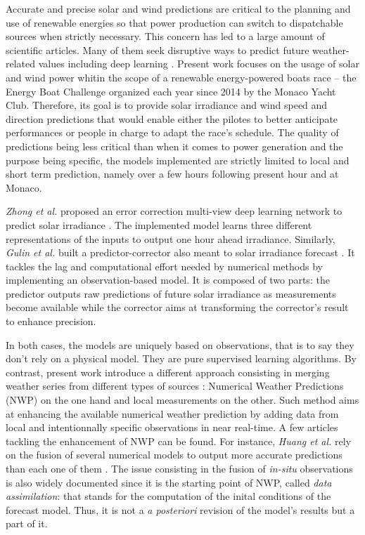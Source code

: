 \documentclass{article}
\newcommand{\saut}{\vspace{10px}}
\begin{document}
Accurate and precise solar and wind predictions are critical to the planning and use of renewable energies so that
power production can switch to dispatchable sources when strictly necessary. This concern has led to a large amount of
scientific articles. Many of them seek disruptive ways to predict future weather-related values including deep learning
\cite{zhong_multi-view_2021}.
Present work focuses on the usage of solar and wind power whitin the scope of a renewable energy-powered boats race
-- the Energy Boat Challenge organized each year since 2014 by the Monaco Yacht Club. Therefore, its goal is to provide
solar irradiance and wind speed and direction predictions that would enable either the pilotes to better anticipate
performances or people in charge to adapt the race's schedule. The quality of predictions being less critical than
when it comes to power generation and the purpose being specific, the models implemented are strictly limited to
local and short term prediction, namely over a few hours following present hour and at Monaco.

\saut

\emph{Zhong et al.} proposed an error correction multi-view deep learning network to predict
solar irradiance \cite{zhong_multi-view_2021}. The implemented model learns three different representations of the inputs 
to output one hour ahead irradiance. Similarly, \emph{Gulin et al.} built a predictor-corrector also meant to solar irradiance
forecast \cite{gulin_predictor-corrector_2015}. It tackles the lag and computational effort needed by numerical methods by implementing an observation-based model. It is composed of two parts: the predictor outputs raw
predictions of future solar irradiance as measurements become available while the corrector aims at transforming
the corrector's result to enhance precision.

\saut

In both cases, the models are uniquely based on observations, that is to say they don't rely on a physical model.
They are pure supervised learning algorithms. By contrast, present work introduce a different approach consisting in
merging weather series from different types of sources : Numerical Weather Predictions (NWP) on the one hand and
local measurements on the other. Such method aims at enhancing the available numerical weather prediction by 
adding data from local and intentionnally specific observations in near real-time. A few articles tackling the
enhancement of NWP can be found. For instance, \emph{Huang et al.} rely on the fusion of several numerical models to 
output more accurate predictions than each one of them \cite{huang_integrating_2012}. The issue consisting in the fusion 
of \emph{in-situ} observations is also widely documented since it is the starting point of NWP, called
\emph{data assimilation}: that stands for the computation
of the inital conditions of the forecast model. Thus, it is not a \emph{a posteriori} revision of the model's results but
a part of it. 
\end{document}
